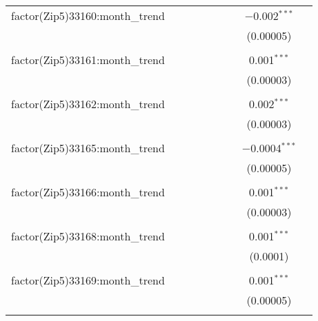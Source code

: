 \begin{table}[H]
{\begin{tabular}{@{\extracolsep{5pt}}lcccccccc}
  factor(Zip5)33160:month\_trend &  &  &  &  &  &  & $-$0.002$^{***}$ &  \\  

   &  &  &  &  &  &  & (0.00005) &  \\  

   & & & & & & & & \\  

  factor(Zip5)33161:month\_trend &  &  &  &  &  &  & 0.001$^{***}$ &  \\  

   &  &  &  &  &  &  & (0.00003) &  \\  

   & & & & & & & & \\  

  factor(Zip5)33162:month\_trend &  &  &  &  &  &  & 0.002$^{***}$ &  \\  

   &  &  &  &  &  &  & (0.00003) &  \\  

   & & & & & & & & \\  

  factor(Zip5)33165:month\_trend &  &  &  &  &  &  & $-$0.0004$^{***}$ &  \\  

   &  &  &  &  &  &  & (0.00005) &  \\  

   & & & & & & & & \\  

  factor(Zip5)33166:month\_trend &  &  &  &  &  &  & 0.001$^{***}$ &  \\  

   &  &  &  &  &  &  & (0.00003) &  \\  

   & & & & & & & & \\  

  factor(Zip5)33168:month\_trend &  &  &  &  &  &  & 0.001$^{***}$ &  \\  

   &  &  &  &  &  &  & (0.0001) &  \\  

   & & & & & & & & \\  

  factor(Zip5)33169:month\_trend &  &  &  &  &  &  & 0.001$^{***}$ &  \\  

   &  &  &  &  &  &  & (0.00005) &  \\  

   & & & & & & & & \\  


\end{tabular}}
\end{table}
